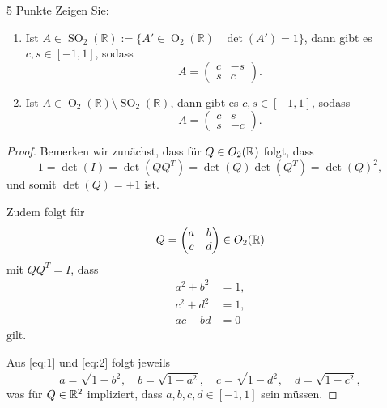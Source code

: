 \documentclass{problemset}
\begin{document}
\begin{problem}{5 Punkte}
Zeigen Sie:
\begin{enumerate}
    \item Ist $A \in \operatorname{SO}_2(\mathbb{R}) := \{A' \in
              \operatorname{O}_2(\mathbb{R}) \mid \det(A') = 1\}$, dann gibt es $c, s \in
              [-1, 1]$, sodass
          \[
              A = \begin{pmatrix}
                  c & -s \\
                  s & c
              \end{pmatrix}.
          \]
    \item Ist $A \in \operatorname{O}_2(\mathbb{R}) \setminus
              \operatorname{SO}_2(\mathbb{R})$, dann gibt es $c, s \in [-1, 1]$, sodass
          \[
              A = \begin{pmatrix}
                  c & s  \\
                  s & -c
              \end{pmatrix}.
          \]
\end{enumerate}
\begin{proof}
    Bemerken wir zunächst, dass für \(Q \in O_2(\mathbb{R})\) folgt, dass
    \begin{equation*}
        1 = \det(I) = \det(Q Q^T) = \det(Q) \det(Q^T) = \det(Q)^2,
    \end{equation*}
    und somit \(\det(Q) = \pm 1\) ist.

    Zudem folgt für
    \[
        Q = \begin{pmatrix}
            a & b \\
            c & d
        \end{pmatrix} \in O_2(\mathbb{R})
    \]
    mit \(Q Q^T = I\), dass
    \begin{align}
        a^2 + b^2 & = 1, \label{eq:1} \\
        c^2 + d^2 & = 1, \label{eq:2} \\
        ac + bd   & = 0 \label{eq:3}
    \end{align}
    gilt.

    Aus \eqref{eq:1} und \eqref{eq:2} folgt jeweils
    \begin{equation*}
        a = \sqrt{1 - b^2}, \quad b = \sqrt{1 - a^2}, \quad c = \sqrt{1 - d^2}, \quad d = \sqrt{1 - c^2},
    \end{equation*}
    was für \(Q \in \mathbb{R}^2\) impliziert, dass \(a, b, c, d \in [-1, 1]\) sein müssen.


\end{proof}
\end{problem}
\end{document}
